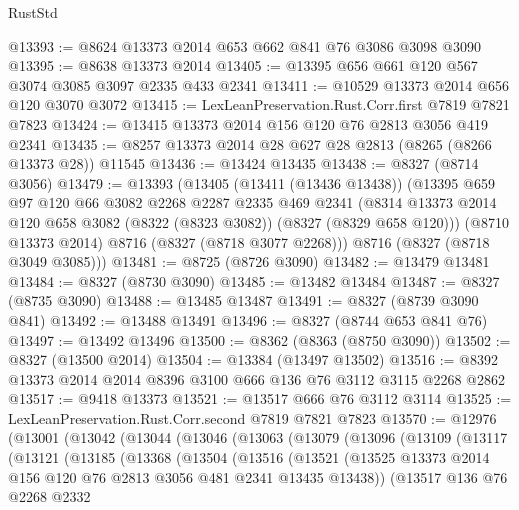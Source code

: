 \begin{lexlean}{RustStd}
\begin{coremodule}
@13393 := @8624 @13373 @2014 @653 @662 @841 @76 @3086 @3098 @3090
@13395 := @8638 @13373 @2014
@13405 := @13395 @656 @661 @120 @567 @3074 @3085 @3097 @2335 @433 @2341
@13411 := @10529 @13373 @2014 @656 @120 @3070 @3072
@13415 := LexLeanPreservation.Rust.Corr.first @7819 @7821 @7823
@13424 := @13415 @13373 @2014 @156 @120 @76 @2813 @3056 @419 @2341
@13435 := @8257 @13373 @2014 @28 @627 @28 @2813 (@8265 (@8266 @13373 @28)) @11545
@13436 := @13424 @13435
@13438 := @8327 (@8714 @3056)
@13479 := @13393
    (@13405
      (@13411 (@13436 @13438))
      (@13395
        @659
        @97
        @120
        @66
        @3082
        @2268
        @2287
        @2335
        @469
        @2341
        (@8314 @13373 @2014 @120 @658 @3082 (@8322 (@8323 @3082)) (@8327 (@8329 @658 @120)))
        (@8710 @13373 @2014)
        @8716
        (@8327 (@8718 @3077 @2268)))
      @8716
      (@8327 (@8718 @3049 @3085)))
@13481 := @8725 (@8726 @3090)
@13482 := @13479 @13481
@13484 := @8327 (@8730 @3090)
@13485 := @13482 @13484
@13487 := @8327 (@8735 @3090)
@13488 := @13485 @13487
@13491 := @8327 (@8739 @3090 @841)
@13492 := @13488 @13491
@13496 := @8327 (@8744 @653 @841 @76)
@13497 := @13492 @13496
@13500 := @8362 (@8363 (@8750 @3090))
@13502 := @8327 (@13500 @2014)
@13504 := @13384 (@13497 @13502)
@13516 := @8392 @13373 @2014 @2014 @8396 @3100 @666 @136 @76 @3112 @3115 @2268 @2862
@13517 := @9418 @13373
@13521 := @13517 @666 @76 @3112 @3114
@13525 := LexLeanPreservation.Rust.Corr.second @7819 @7821 @7823
@13570 := @12976
    (@13001
      (@13042
        (@13044
          (@13046
            (@13063
              (@13079
                (@13096
                  (@13109
                    (@13117
                      (@13121
                        (@13185
                          (@13368
                            (@13504
                              (@13516
                                (@13521
                                  (@13525
                                    @13373
                                    @2014
                                    @156
                                    @120
                                    @76
                                    @2813
                                    @3056
                                    @481
                                    @2341
                                    @13435
                                    @13438))
                                (@13517
                                  @136
                                  @76
                                  @2268
                                  @2332

\end{coremodule}
\end{lexlean}
